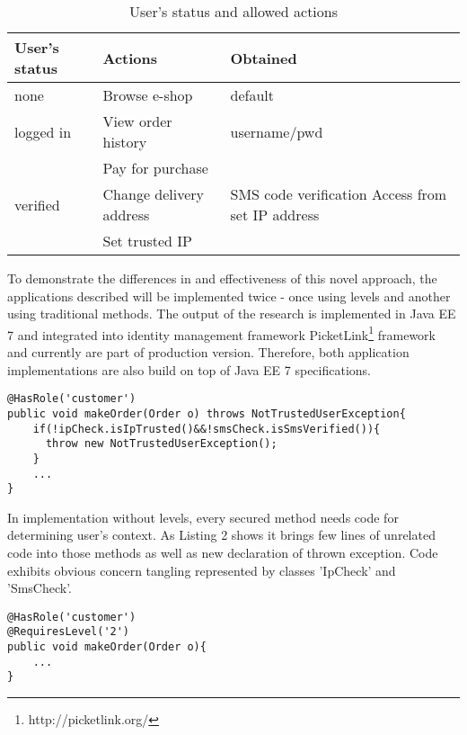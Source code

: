 \documentclass{sig-alternate-05-2015}
\begin{document}
\begin{table}
\vspace{0.5em}
\begin{tabular}{|m{1.9cm}|m{2.5cm}|m{3cm}|} \hline
User's status&Actions&Obtained\\ \hline
none & Browse e-shop & default\\ \hline
logged in & View order \newline history & username/pwd\\ \hline
 & Pay for purchase & \multirow{3}{*}{\parbox[t][][c]{3cm}{SMS code verification \newline Access from set IP address}} \\[5pt]
verified & Change delivery address &  \\[5pt] 
 & Set trusted IP & \\[5pt]
\hline\end{tabular}
\vspace{-0.8em}
\caption{User's status and allowed actions}
\vspace{-1em}
\end{table}

To demonstrate the differences in and effectiveness of this novel approach, the applications described will be implemented twice - once using levels and another using traditional methods. The output of the research is implemented in Java EE 7 and integrated into identity management framework PicketLink\footnote{http://picketlink.org/} framework and currently are part of production version. Therefore, both application implementations are also build on top of Java EE 7 specifications.

\begin{lstlisting}[]
@HasRole('customer')
public void makeOrder(Order o) throws NotTrustedUserException{
    if(!ipCheck.isIpTrusted()&&!smsCheck.isSmsVerified()){
      throw new NotTrustedUserException();
    }
    ...
}          
\end{lstlisting}

In implementation without levels, every secured method needs code for determining user's context. As Listing 2 shows it brings few lines of unrelated code into those methods as well as new declaration of thrown exception. Code exhibits obvious concern tangling \cite{concernSeparation} represented by classes 'IpCheck' and 'SmsCheck'.

\begin{lstlisting}[]
@HasRole('customer')
@RequiresLevel('2')
public void makeOrder(Order o){
    ...
}          
\end{lstlisting}
\end{document}
